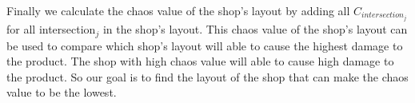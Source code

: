 Finally we calculate the chaos value of the shop's layout by adding all $C_{intersection_j}$ for all intersection$_j$ in the shop's layout. This chaos value of the shop's layout can be used to compare which shop's layout will able to cause the highest damage to the product. The shop with high chaos value will able to cause high damage to the product. So our goal is to find the layout of the shop that can make the chaos value to be the lowest.